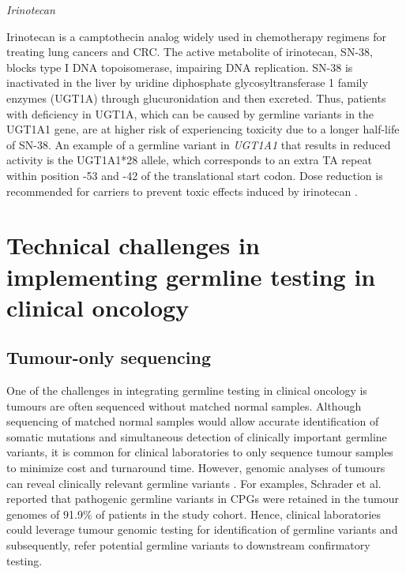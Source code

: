 \newpage
\vspace{5mm}
\noindent\textit{Irinotecan}

Irinotecan is a camptothecin analog widely used in chemotherapy regimens for treating lung cancers and CRC. The active metabolite of irinotecan, SN-38, blocks type I DNA topoisomerase, impairing DNA replication. SN-38 is inactivated in the liver by uridine diphosphate glycosyltransferase 1 family enzymes (\acs{UGT1A}) through glucuronidation and then excreted. Thus, patients with deficiency in UGT1A, which can be caused by germline variants in the \acs{UGT1A1} gene, are at higher risk of experiencing toxicity due to a longer half-life of SN-38. An example of a germline variant in \textit{UGT1A1} that results in reduced activity is the UGT1A1*28 allele, which corresponds to an extra TA repeat within position -53 and -42 of the translational start codon. Dose reduction is recommended for carriers to prevent toxic effects induced by irinotecan \cite{Panczyk2014, Mohelnikova-Duchonova2014}.

\section{Technical challenges in implementing germline testing in clinical oncology}
\label{sec:Challengesinclinicalgermlinetesting}

\subsection{Tumour-only sequencing}

One of the challenges in integrating germline testing in clinical oncology is tumours are often sequenced without matched normal samples. Although sequencing of matched normal samples would allow accurate identification of somatic mutations and simultaneous detection of clinically important germline variants, it is common for clinical laboratories to only sequence tumour samples to minimize cost and turnaround time. However, genomic analyses of tumours can reveal clinically relevant germline variants \cite{Schrader2015, Jones2015a, Meric-Bernstam2016, Bombard2014, WcWhinney2009}. For examples, Schrader et al. \cite{Schrader2015} reported that pathogenic germline variants in CPGs were retained in the tumour genomes of 91.9\% of patients in the study cohort. Hence, clinical laboratories could leverage tumour genomic testing for identification of germline variants and subsequently, refer potential germline variants to downstream confirmatory testing.

